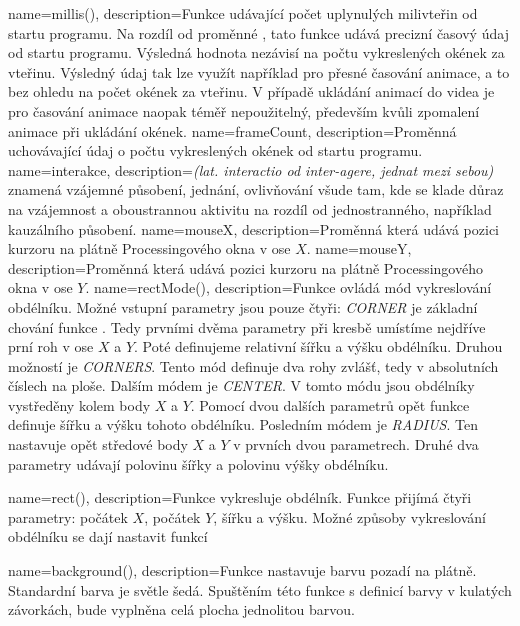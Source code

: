 {
  name={millis()},
  description={Funkce udávající počet uplynulých milivteřin od startu programu. Na rozdíl od proměnné , tato funkce udává precizní časový údaj od startu programu. Výsledná hodnota nezávisí na počtu vykreslených okének za vteřinu. Výsledný údaj tak lze využít například pro přesné časování animace, a to bez ohledu na počet okének za vteřinu. V případě ukládání animací do videa je pro časování animace naopak téměř nepoužitelný, především kvůli zpomalení animace při ukládání okének.}
}
{ 
  name={frameCount},
  description={Proměnná uchovávající údaj o počtu vykreslených okének od startu programu.}
}
{
  name={interakce},
  description={{\em (lat. interactio od inter-agere, jednat mezi sebou)} znamená vzájemné působení, jednání, ovlivňování všude tam, kde se klade důraz na vzájemnost a oboustrannou aktivitu na rozdíl od jednostranného, například kauzálního působení.}
}
{
  name={mouseX},
  description={Proměnná která udává pozici kurzoru na plátně Processingového okna v ose $X$.}
}
{
  name={mouseY},
  description={Proměnná která udává pozici kurzoru na plátně Processingového okna v ose $Y$.}
}
{
  name={rectMode()},
  description={Funkce ovládá mód vykreslování obdélníku. Možné vstupní parametry jsou pouze čtyři:  {\em CORNER} je základní chování funkce . Tedy prvními dvěma parametry při kresbě umístíme nejdříve prní roh v ose $X$ a $Y$. Poté definujeme relativní šířku a výšku obdélníku. Druhou možností je {\em CORNERS}. Tento mód definuje dva rohy zvlášť, tedy v absolutních číslech na ploše. Dalším módem je {\em CENTER}. V tomto módu jsou obdélníky vystředěny kolem body $X$ a $Y$. Pomocí dvou dalších parametrů opět funkce  definuje šířku a výšku tohoto obdélníku. Posledním módem je {\em RADIUS}. Ten nastavuje opět středové body $X$ a $Y$ v prvních dvou parametrech. Druhé dva parametry udávají polovinu šířky a polovinu výšky obdélníku.}
}

{
  name={rect()},
  description={Funkce vykresluje obdélník. Funkce přijímá čtyři parametry: počátek $X$, počátek $Y$, šířku a výšku. Možné způsoby vykreslování obdélníku se dají nastavit funkcí }
}

{
  name={background()},
  description={Funkce nastavuje barvu pozadí na plátně. Standardní barva je světle šedá. Spuštěním této funkce s definicí barvy v kulatých závorkách, bude vyplněna celá plocha jednolitou barvou.}
}


